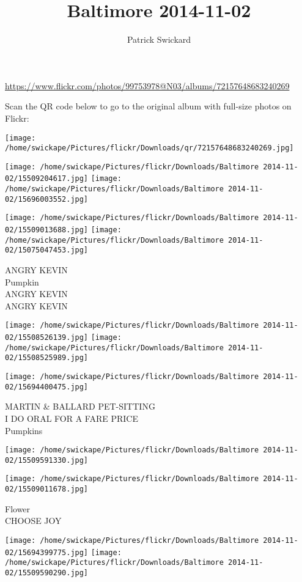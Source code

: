 \documentclass[10pt,letterpaper]{article}
\title{Baltimore 2014-11-02}
\author{Patrick Swickard}
\date{}
\begin{document}
\maketitle

\url{https://www.flickr.com/photos/99753978@N03/albums/72157648683240269}

Scan the QR code below to go to the original album with full-size photos on Flickr:

\texttt{[image: /home/swickape/Pictures/flickr/Downloads/qr/72157648683240269.jpg]}
\pagebreak

\texttt{[image: /home/swickape/Pictures/flickr/Downloads/Baltimore 2014-11-02/15509204617.jpg]}
\texttt{[image: /home/swickape/Pictures/flickr/Downloads/Baltimore 2014-11-02/15696003552.jpg]}

\texttt{[image: /home/swickape/Pictures/flickr/Downloads/Baltimore 2014-11-02/15509013688.jpg]}
\texttt{[image: /home/swickape/Pictures/flickr/Downloads/Baltimore 2014-11-02/15075047453.jpg]}

ANGRY KEVIN\\
Pumpkin\\
ANGRY KEVIN\\
ANGRY KEVIN
\pagebreak

\texttt{[image: /home/swickape/Pictures/flickr/Downloads/Baltimore 2014-11-02/15508526139.jpg]}
\texttt{[image: /home/swickape/Pictures/flickr/Downloads/Baltimore 2014-11-02/15508525989.jpg]}

\vspace{0.25in}
\texttt{[image: /home/swickape/Pictures/flickr/Downloads/Baltimore 2014-11-02/15694400475.jpg]}

MARTIN \& BALLARD PET{-}SITTING\\
I DO ORAL FOR A FARE PRICE\\
Pumpkins
\pagebreak

\texttt{[image: /home/swickape/Pictures/flickr/Downloads/Baltimore 2014-11-02/15509591330.jpg]}

\vspace{0.25in}
\texttt{[image: /home/swickape/Pictures/flickr/Downloads/Baltimore 2014-11-02/15509011678.jpg]}

Flower\\
CHOOSE JOY
\pagebreak

\texttt{[image: /home/swickape/Pictures/flickr/Downloads/Baltimore 2014-11-02/15694399775.jpg]}
\texttt{[image: /home/swickape/Pictures/flickr/Downloads/Baltimore 2014-11-02/15509590290.jpg]}
\end{document}
